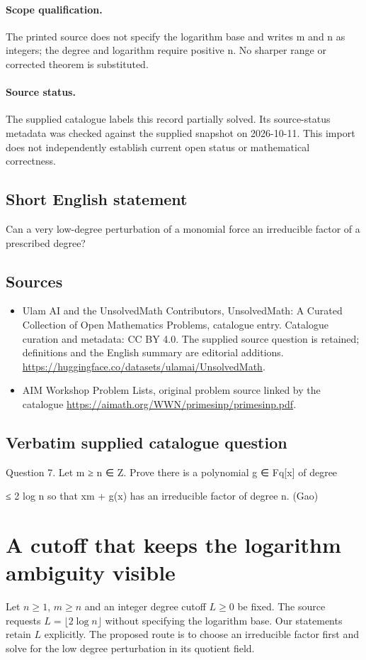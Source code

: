 \documentclass[11pt]{article}
\begin{document}
\paragraph{Scope qualification.}
The printed source does not specify the logarithm base and writes m and n as integers; the degree and logarithm require positive n. No sharper range or corrected theorem is substituted.
\paragraph{Source status.}
The supplied catalogue labels this record partially solved. Its source-status metadata was checked against the supplied snapshot on 2026-10-11. This import does not independently establish current open status or mathematical correctness.
\subsection{Short English statement}
Can a very low-degree perturbation of a monomial force an irreducible factor of a prescribed degree?
\subsection{Sources}
\begin{itemize}
\item[S1] Ulam AI and the UnsolvedMath Contributors, UnsolvedMath: A Curated Collection of Open Mathematics Problems, catalogue entry. Catalogue curation and metadata: CC BY 4.0. The supplied source question is retained; definitions and the English summary are editorial additions.
\url{https://huggingface.co/datasets/ulamai/UnsolvedMath}.
\item[S2] AIM Workshop Problem Lists, original problem source linked by the catalogue
\url{https://aimath.org/WWN/primesinp/primesinp.pdf}.
\end{itemize}
\subsection{Verbatim supplied catalogue question}
Question 7. Let m ≥ n ∈ Z. Prove there is a polynomial g ∈ Fq[x] of degree

≤ 2 log n so that xm + g(x) has an irreducible factor of degree n. (Gao)

\section{A cutoff that keeps the logarithm ambiguity visible}
Let $n\ge1$, $m\ge n$ and an integer degree cutoff $L\ge0$ be fixed.
The source requests $L=\lfloor2\log n\rfloor$ without specifying the
logarithm base. Our statements retain $L$ explicitly. The proposed
route is to choose an irreducible factor first and solve for the low
degree perturbation in its quotient field.
\end{document}
